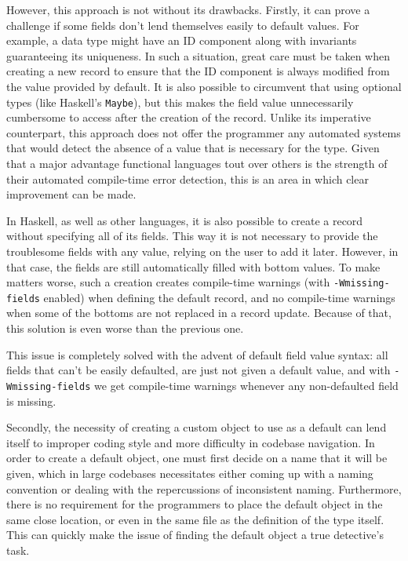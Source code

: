 \documentclass[en]{pracamgr}
\newcommand{\code}[1]{\lstinline[breaklines=true]{#1}}
\begin{document}
However, this approach is not without its drawbacks.
Firstly, it can prove a challenge if some fields don't lend themselves easily to default values. 
For example, a data type might have an ID component along with invariants guaranteeing its uniqueness. 
In such a situation, great care must be taken when creating a new record to ensure that the ID component is always modified from the value provided by default.
It is also possible to circumvent that using optional types (like Haskell's \code{Maybe}), 
but this makes the field value unnecessarily cumbersome to access after the creation of the record.
Unlike its imperative counterpart, this approach does not offer the programmer any automated systems 
that would detect the absence of a value that is necessary for the type.
Given that a major advantage functional languages tout over others is the strength of their automated compile-time error detection, 
this is an area in which clear improvement can be made.

In Haskell, as well as other languages, it is also possible to create a record without specifying all of its fields.
This way it is not necessary to provide the troublesome fields with any value, relying on the user to add it later.
However, in that case, the fields are still automatically filled with bottom values.
To make matters worse, such a creation creates compile-time warnings (with \code{-Wmissing-fields} enabled) when defining the default record, 
and no compile-time warnings when some of the bottoms are not replaced in a record update.
Because of that, this solution is even worse than the previous one.

This issue is completely solved with the advent of default field value syntax: all fields that can't be easily defaulted, 
are just not given a default value, and with \code{-Wmissing-fields} we get compile-time warnings whenever any non-defaulted field is missing. 

Secondly, the necessity of creating a custom object to use as a default can lend itself to improper coding style and more difficulty in codebase navigation.
In order to create a default object, one must first decide on a name that it will be given, which in large codebases 
necessitates either coming up with a naming convention or dealing with the repercussions of inconsistent naming. 
Furthermore, there is no requirement for the programmers to place the default object in the same close location, 
or even in the same file as the definition of the type itself.
This can quickly make the issue of finding the default object a true detective's task. 
\end{document}
